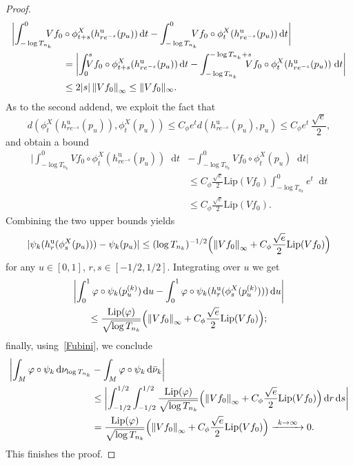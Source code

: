 \documentclass[JEP,XML,SOM,NoEqCountersInSection,Unicode,published]{cedram}
\newcommand\To[1]{\mathchoice{\xrightarrow{\kern4pt#1\kern3pt}}{\stackrel{#1}{\longrightarrow}}{}{}}
\newcommand{\nnorm}[1]{\lVert#1\rVert}
\newcommand*{\diff}{\mathop{}\!\mathrm{d}}
\newcommand{\norm}[1]{\left\lVert#1\right\rVert}
\theoremstyle{definition}
\begin{document}
\begin{appendix}
\begin{proof}
\begin{align*}
\biggl|\int_{-\log{T_{n_k}}}^{0}\hspace*{-3mm}Vf_0&\circ \phi^{X}_{t+s}(h^{\mathrm{u}}_{re^{-s}}(p_u))\diff t-\int_{-\log{T_{n_k}}}^{0}\hspace*{-3mm}Vf_0\circ \phi^{X}_{t}(h^{\mathrm{u}}_{re^{-s}}(p_u))\diff t\biggr|\\
&=
\biggl|\int_{0}^{s}\hspace*{-3mm}Vf_0\circ \phi^{X}_{t+s}(h^{\mathrm{u}}_{re^{-s}}(p_u))\diff t-\int_{-\log{T_{n_k}}}^{-\log{T_{n_k}}+s}\hspace*{-3mm}Vf_0\circ \phi^{X}_{t}(h^{\mathrm{u}}_{re^{-s}}(p_u))\;
\text{d}t\biggr|\\
&\leq 2|s|\norm{Vf_0}_{\infty}\leq \nnorm{Vf_0}_{\infty}.
\end{align*}
As to the second addend, we exploit the fact that
\begin{equation*}d(\phi^{X}_t(h^{\mathrm{u}}_{re^{-s}}(p_u)),\phi^{X}_t(p_u))\leq C_{\phi}e^{t}d(h^{\mathrm{u}}_{re^{-s}}(p_u),p_u)\leq C_{\phi}e^{t}\,\frac{\sqrt{e}}{2},
\end{equation*}
and obtain a bound
\begin{align*}
\biggl|\int_{-\log{T_{n_k}}}^{0}Vf_0\circ \phi^{X}_{t}(h^{\mathrm{u}}_{re^{-s}}(p_u))\diff t&-\int_{-\log{T_{n_k}}}^{0}Vf_0\circ \phi_t^{X}(p_u)\diff t\biggr|\\
&\leq C_{\phi}\frac{\sqrt{e}}{2}\text{Lip}(Vf_0)\int_{-\log{T_{n_k}}}^{0}e^{t}\diff t\\
&\leq C_{\phi}\frac{\sqrt{e}}{2}\text{Lip}(Vf_0).
\end{align*}
Combining the two upper bounds yields
\begin{equation*}
|\psi_k(h^{\mathrm{u}}_r(\phi^{X}_s(p_u)))-\psi_k(p_u)|\leq (\log{T_{n_k}})^{-1/2}\Bigl(\norm{Vf_0}_{\infty}+C_{\phi}\frac{\sqrt{e}}{2}\text{Lip}(Vf_0)\Bigr)
\end{equation*}
for any $u\in [0,1]$, $r,s\in [-1/2,1/2]$. Integrating over $u$ we get
\begin{multline*}
\biggl|\int_{0}^{1}\varphi\circ\psi_k(p_u^{(k)})\diff u-\int_{0}^{1}\varphi\circ\psi_k(h^{\mathrm{u}}_r(\phi^{X}_{s}(p_u^{(k)})))\diff u\biggr|\\
\leq \frac{\text{Lip}(\varphi)}{\sqrt{\log{T_{n_k}}}}\Bigl(\norm{Vf_0}_{\infty}+C_{\phi}\frac{\sqrt{e}}{2}\text{Lip}(Vf_0)\Bigr);
\end{multline*}
finally, using~\eqref{Fubini}, we conclude
\begin{align*}
\biggl|\int_{M}\varphi\circ \psi_k\diff \nu_{\log{T_{n_k}}}&-\int_{M}\varphi\circ \psi_k\diff \bar{\nu}_k \biggr|\\
&\leq\biggl|\int_{-1/2}^{1/2}\int_{-1/2}^{1/2}\frac{\text{Lip}(\varphi)}{\sqrt{\log{T_{n_k}}}} \Bigl(\norm{Vf_0}_{\infty}+C_{\phi}\frac{\sqrt{e}}{2}\text{Lip}(Vf_0) \Bigr)\diff r\diff s\biggr|\\
&= \frac{\text{Lip}(\varphi)}{\sqrt{\log{T_{n_k}}}}\Bigl(\norm{Vf_0}_{\infty}+C_{\phi}\frac{\sqrt{e}}{2}\text{Lip}(Vf_0)\Bigr)\To{k\to\infty}0.
\end{align*}
This finishes the proof.
\end{proof}

\end{appendix}




\end{document}
